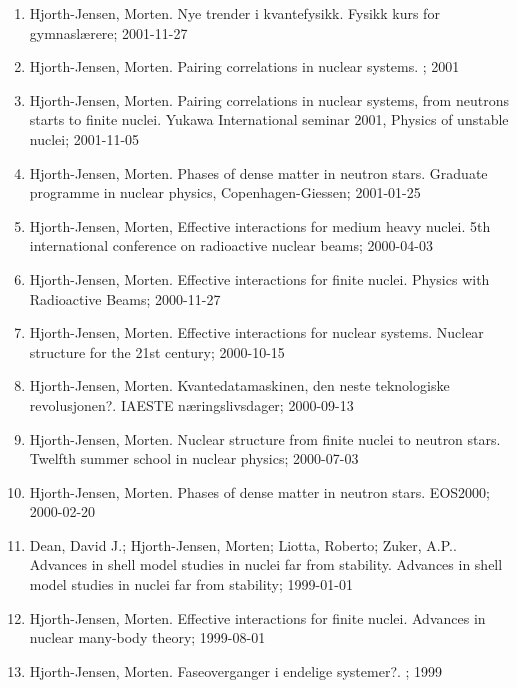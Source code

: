 \documentclass[%
oneside,                 %
final,                   %
10pt]{article}
\begin{document}
\begin{enumerate}
\item Hjorth-Jensen, Morten. Nye trender i kvantefysikk. Fysikk kurs for gymnaslærere; 2001-11-27

\item Hjorth-Jensen, Morten. Pairing correlations in nuclear systems. ; 2001

\item Hjorth-Jensen, Morten. Pairing correlations in nuclear systems, from neutrons starts to finite nuclei. Yukawa International seminar 2001, Physics of unstable nuclei; 2001-11-05

\item Hjorth-Jensen, Morten. Phases of dense matter in neutron stars. Graduate programme in nuclear physics, Copenhagen-Giessen; 2001-01-25

\item Hjorth-Jensen, Morten, Effective interactions for medium heavy nuclei. 5th international conference on radioactive nuclear beams; 2000-04-03

\item Hjorth-Jensen, Morten. Effective interactions for finite nuclei. Physics with Radioactive Beams; 2000-11-27

\item Hjorth-Jensen, Morten. Effective interactions for nuclear systems. Nuclear structure for the 21st century; 2000-10-15

\item Hjorth-Jensen, Morten. Kvantedatamaskinen, den neste teknologiske revolusjonen?. IAESTE næringslivsdager; 2000-09-13

\item Hjorth-Jensen, Morten. Nuclear structure from finite nuclei to neutron stars. Twelfth summer school in nuclear physics; 2000-07-03

\item Hjorth-Jensen, Morten. Phases of dense matter in neutron stars. EOS2000; 2000-02-20

\item Dean, David J.; Hjorth-Jensen, Morten; Liotta, Roberto; Zuker, A.P.. Advances in shell model studies in nuclei far from stability. Advances in shell model studies in nuclei far from stability; 1999-01-01

\item Hjorth-Jensen, Morten. Effective interactions for finite nuclei. Advances in nuclear many-body theory; 1999-08-01

\item Hjorth-Jensen, Morten.  Faseoverganger i endelige systemer?. ; 1999


\end{enumerate}
\end{document}

